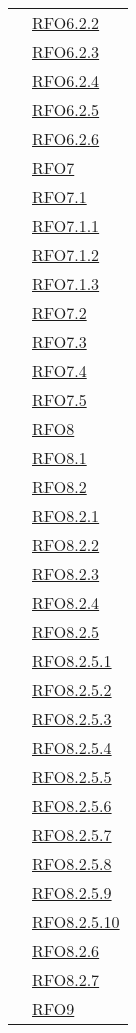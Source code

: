 \begin{longtable}{|>{\centering}m{5cm}|m{5cm}<{\centering}|}
& \hyperlink{RFO6.2.2}{RFO6.2.2}\\
& \hyperlink{RFO6.2.3}{RFO6.2.3}\\
& \hyperlink{RFO6.2.4}{RFO6.2.4}\\
& \hyperlink{RFO6.2.5}{RFO6.2.5}\\
& \hyperlink{RFO6.2.6}{RFO6.2.6}\\
& \hyperlink{RFO7}{RFO7}\\
& \hyperlink{RFO7.1}{RFO7.1}\\
& \hyperlink{RFO7.1.1}{RFO7.1.1}\\
& \hyperlink{RFO7.1.2}{RFO7.1.2}\\
& \hyperlink{RFO7.1.3}{RFO7.1.3}\\
& \hyperlink{RFO7.2}{RFO7.2}\\
& \hyperlink{RFO7.3}{RFO7.3}\\
& \hyperlink{RFO7.4}{RFO7.4}\\
& \hyperlink{RFO7.5}{RFO7.5}\\
& \hyperlink{RFO8}{RFO8}\\
& \hyperlink{RFO8.1}{RFO8.1}\\
& \hyperlink{RFO8.2}{RFO8.2}\\
& \hyperlink{RFO8.2.1}{RFO8.2.1}\\
& \hyperlink{RFO8.2.2}{RFO8.2.2}\\
& \hyperlink{RFO8.2.3}{RFO8.2.3}\\
& \hyperlink{RFO8.2.4}{RFO8.2.4}\\
& \hyperlink{RFO8.2.5}{RFO8.2.5}\\
& \hyperlink{RFO8.2.5.1}{RFO8.2.5.1}\\
& \hyperlink{RFO8.2.5.2}{RFO8.2.5.2}\\
& \hyperlink{RFO8.2.5.3}{RFO8.2.5.3}\\
& \hyperlink{RFO8.2.5.4}{RFO8.2.5.4}\\
& \hyperlink{RFO8.2.5.5}{RFO8.2.5.5}\\
& \hyperlink{RFO8.2.5.6}{RFO8.2.5.6}\\
& \hyperlink{RFO8.2.5.7}{RFO8.2.5.7}\\
& \hyperlink{RFO8.2.5.8}{RFO8.2.5.8}\\
& \hyperlink{RFO8.2.5.9}{RFO8.2.5.9}\\
& \hyperlink{RFO8.2.5.10}{RFO8.2.5.10}\\
& \hyperlink{RFO8.2.6}{RFO8.2.6}\\
& \hyperlink{RFO8.2.7}{RFO8.2.7}\\
& \hyperlink{RFO9}{RFO9}\\

\end{longtable}
